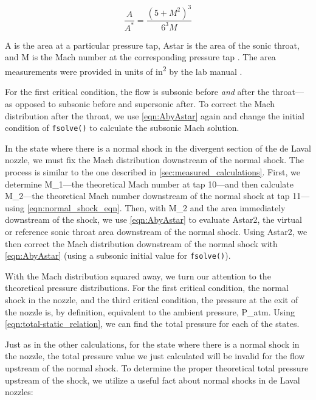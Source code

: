 \begin{equation} \label{eqn:AbyAstar}
    \frac{A}{A^*} = \frac{\left(5 + M^2\right)^3}{6^3M}
\end{equation}

\noindent{}\gls{A} is the area at a particular pressure tap, \gls{Astar} is the area of the sonic throat, and \gls{M} is the Mach number at the corresponding pressure tap \citep{2024durbin}. The area measurements were provided in units of \unit{in^2} by the lab manual \citep{lab10-manual}.

For the first critical condition, the flow is subsonic before \textit{and} after the throat—as opposed to subsonic before and supersonic after. To correct the Mach distribution after the throat, we use \autoref{eqn:AbyAstar} again and change the initial condition of \verb|fsolve()| to calculate the subsonic Mach solution.

In the state where there is a normal shock in the divergent section of the de Laval nozzle, we must fix the Mach distribution downstream of the normal shock. The process is similar to the one described in \autoref{sec:measured_calculations}. First, we determine \gls{M_1}—the theoretical Mach number at tap \num{10}—and then calculate \gls{M_2}—the theoretical Mach number downstream of the normal shock at tap \num{11}—using \autoref{eqn:normal_shock_eqn}. Then, with \gls{M_2} and the area immediately downstream of the shock, we use \autoref{eqn:AbyAstar} to evaluate \gls{Astar2}, the virtual or reference sonic throat area downstream of the normal shock. Using \gls{Astar2}, we then correct the Mach distribution downstream of the normal shock with \autoref{eqn:AbyAstar} (using a subsonic initial value for \verb|fsolve()|).

With the Mach distribution squared away, we turn our attention to the theoretical pressure distributions. For the first critical condition, the normal shock in the nozzle, and the third critical condition, the pressure at the exit of the nozzle is, by definition, equivalent to the ambient pressure, \gls{P_atm}. Using \autoref{eqn:total-static_relation}, we can find the total pressure for each of the states.

Just as in the other calculations, for the state where there is a normal shock in the nozzle, the total pressure value we just calculated will be invalid for the flow upstream of the normal shock. To determine the proper theoretical total pressure upstream of the shock, we utilize a useful fact about normal shocks in de Laval nozzles:

